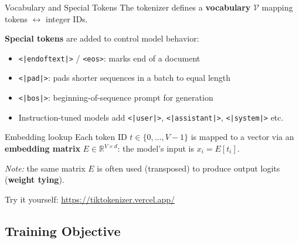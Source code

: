 \begin{frame}{Vocabulary and Special Tokens}
  The tokenizer defines a \textbf{vocabulary} $\mathcal{V}$ mapping tokens $\leftrightarrow$ integer IDs.

  \vspace{0.5em}
  \textbf{Special tokens} are added to control model behavior:
  \begin{itemize}
    \item \texttt{<|endoftext|>} / \texttt{<eos>}: marks end of a document
    \item \texttt{<|pad|>}: pads shorter sequences in a batch to equal length
    \item \texttt{<|bos|>}: beginning-of-sequence prompt for generation
    \item Instruction-tuned models add \texttt{<|user|>}, \texttt{<|assistant|>}, \texttt{<|system|>} etc.
  \end{itemize}

  \vspace{0.5em}
  \begin{block}{Embedding lookup}
    Each token ID $t \in \{0, \ldots, V{-}1\}$ is mapped to a vector via an \textbf{embedding matrix}
    $E \in \mathbb{R}^{V \times d}$: the model's input is $x_i = E[t_i]$.
  \end{block}

  \vspace{0.5em}
  \textit{Note:} the same matrix $E$ is often used (transposed) to produce output logits (\textbf{weight tying}).

  \vspace{0.5em}
  Try it yourself: \url{https://tiktokenizer.vercel.app/}
\end{frame}

\subsection{Training Objective}

